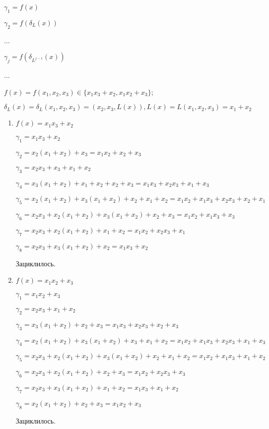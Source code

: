 \documentclass[utf8x, 14pt]{G7-32} %
\begin{document}
$\gamma_1 = f(x)$

$\gamma_2=f(\delta_L(x))$

...

$\gamma_j=f(\delta_{L^{j-1}}(x))$

...

$f(x)=f(x_1,x_2,x_3)\in\{x_1 x_3+x_2, x_1 x_2+x_3\}$;

$\delta_L(x)=\delta_L(x_1,x_2,x_3)=(x_2,x_3,L(x)), L(x)=L(x_1,x_2,x_3)= x_1+x_2$

\begin{enumerate}
    \item $f(x)=x_1 x_3 + x_2$
    
    $\gamma_1= x_1 x_3 +x_2$
    
    $\gamma_2 = x_2 (x_1 + x_2) + x_3 = x_1 x_2 + x_2 + x_3$
    
    $\gamma_3 = x_2 x_3 + x_3 + x_1 + x_2$
    
    $\gamma_4 = x_3 (x_1 + x_2) + x_1 + x_2 + x_2 + x_3 = x_1 x_3 + x_2 x_3 + x_1 + x_3$
    
    $\gamma_5 = x_2 (x_1 + x_2) + x_3 (x_1 + x_2) + x_2 + x_1 + x_2 = x_1 x_2 + x_1 x_3 + x_2 x_3 + x_2 +x_1$
    
    $\gamma_6 = x_2 x_3 + x_2 (x_1 + x_2) + x_3 (x_1 + x_2) + x_2 + x_3 = x_1 x_2 + x_1 x_3 + x_3$
    
    $\gamma_7 = x_2 x_3 + x_2 (x_1 + x_2) + x_1 + x_2 = x_1 x_2 + x_2 x_3 + x_1$
    
    $\gamma_8 = x_2 x_3 + x_3 (x_1 + x_2) + x_2 = x_1 x_3 + x_2$
    
    Зациклилось.
    
    
    \item $f(x)=x_1 x_2 + x_3$
    
    $\gamma_1 = x_1 x_2 + x_3$
    
    $\gamma_2 = x_2 x_3 + x_1 + x_2$
    
    $\gamma_3 = x_3 (x_1 + x_2) + x_2 + x_3 = x_1 x_3 + x_2 x_3 + x_2 + x_3$
    
    $\gamma_4 = x_2 (x_1 + x_2) + x_3 (x_1 + x_2) + x_3 + x_1 + x_2 = x_1 x_2 + x_1 x_3 + x_2 x_3 + x_1 + x_3$
    
    $\gamma_5 = x_2 x_3 + x_2 (x_1 + x_2) + x_3 (x_1 + x_2) +x_2 + x_1 + x_2 = x_1 x_2 + x_1 x_3 + x_1 + x_2$
    
    $\gamma_6 = x_2 x_3 + x_2 (x_1 + x_2) + x_2 + x_3 = x_1 x_2 + x_2 x_3 + x_3$
    
    $\gamma_7 = x_2 x_3 + x_3 (x_1 + x_2) + x_1 + x_2 = x_1 x_3 + x_1 + x_2$
    
    $\gamma_8 = x_2 (x_1 + x_2) + x_2 + x_3 = x_1 x_2 + x_3$
    
    Зациклилось.
\end{enumerate}
\end{document}
